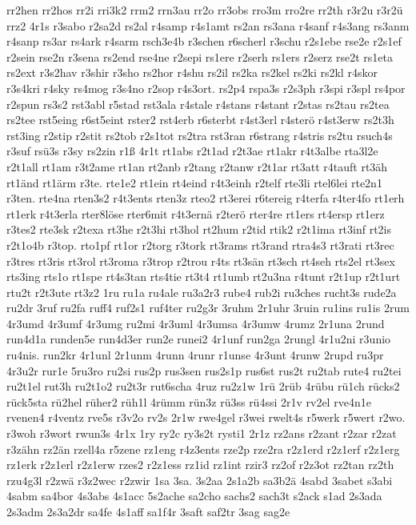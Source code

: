 {rr2hen
rr2hos
rr2i
rri3k2
rrm2
rrn3au
rr2o
rr3obs
rro3m
rro2re
rr2th
r3r2u
r3r2ü
rrz2
4r1s
r3sabo
r2sa2d
rs2al
r4samp
r4s1amt
rs2an
rs3ana
r4sanf
r4s3ang
rs3anm
r4sanp
rs3ar
rs4ark
r4sarm
rsch3e4b
r3schen
r6scherl
r3schu
r2s1ebe
rse2e
r2s1ef
r2sein
rse2n
r3sena
rs2end
rse4ne
r2sepi
rs1ere
r2serh
rs1ers
r2serz
rse2t
rs1eta
rs2ext
r3s2hav
r3shir
r3sho
rs2hor
r4shu
rs2il
rs2ka
rs2kel
rs2ki
rs2kl
r4skor
r3s4kri
r4sky
rs4mog
r3s4no
r2sop
r4s3ort.
rs2p4
rspa3s
r2s3ph
r3spi
r3spl
rs4por
r2spun
rs3s2
rst3abl
r5stad
rst3ala
r4stale
r4stans
r4stant
r2stas
rs2tau
rs2tea
rs2tee
rst5eing
r6st5eint
rster2
rst4erb
r6sterbt
r4st3erl
r4sterö
r4st3erw
rs2t3h
rst3ing
r2stip
r2stit
rs2tob
r2s1tot
rs2tra
rst3ran
r6strang
r4stris
rs2tu
rsuch4s
r3suf
rsü3s
r3sy
rs2zin
r1ß
4r1t
rt1abs
r2t1ad
r2t3ae
rt1akr
r4t3albe
rta3l2e
r2t1all
rt1am
r3t2ame
rt1an
rt2anb
r2tang
r2tanw
r2t1ar
rt3att
r4tauft
rt3äh
rt1änd
rt1ärm
r3te.
rte1e2
rt1ein
rt4eind
r4t3einh
r2telf
rte3li
rtel6lei
rte2n1
r3ten.
rte4na
rten3s2
r4t3ents
rten3z
rteo2
rt3erei
r6tereig
r4terfa
r4ter4fo
rt1erh
rt1erk
r4t3erla
rter8löse
rter6mit
r4t3ernä
r2terö
rter4re
rt1ers
rt4ersp
rt1erz
r3tes2
rte3sk
r2texa
rt3he
r2t3hi
rt3hol
rt2hum
r2tid
rtik2
r2t1ima
rt3inf
rt2is
r2t1o4b
r3top.
rto1pf
rt1or
r2torg
r3tork
rt3rams
rt3rand
rtra4s3
rt3rati
rt3rec
r3tres
rt3ris
rt3rol
rt3roma
r3trop
r2trou
r4ts
rt3sän
rt3sch
rt4seh
rts2el
rt3sex
rts3ing
rts1o
rt1spe
rt4s3tan
rts4tie
rt3t4
rt1umb
rt2u3na
r4tunt
r2t1up
r2t1urt
rtu2t
r2t3ute
rt3z2
1ru
ru1a
ru4ale
ru3a2r3
rube4
rub2i
ru3ches
rucht3s
rude2a
ru2dr
3ruf
ru2fa
ruff4
ruf2s1
ruf4ter
ru2g3r
3ruhm
2r1uhr
3ruin
ru1ins
ru1is
2rum
4r3umd
4r3umf
4r3umg
ru2mi
4r3uml
4r3umsa
4r3umw
4rumz
2r1una
2rund
run4d1a
runden5e
run4d3er
run2e
runei2
4r1unf
run2ga
2rungl
4r1u2ni
r3unio
ru4nis.
run2kr
4r1unl
2r1unm
4runn
4runr
r1unse
4r3unt
4runw
2rupd
ru3pr
4r3u2r
rur1e
5ru3ro
ru2si
rus2p
rus3sen
rus2s1p
rus6st
rus2t
ru2tab
rute4
ru2tei
ru2t1el
rut3h
ru2t1o2
ru2t3r
rut6scha
4ruz
ru2z1w
1rü
2rüb
4rübu
rü1ch
rücks2
rück5sta
rü2hel
rüher2
rüh1l
4rümm
rün3z
rü3ss
rü4ssi
2r1v
rv2el
rve4n1e
rvenen4
r4ventz
rve5s
r3v2o
rv2s
2r1w
rwe4gel
r3wei
rwelt4s
r5werk
r5wert
r2wo.
r3woh
r3wort
rwun3s
4r1x
1ry
ry2c
ry3s2t
rysti1
2r1z
rz2ans
r2zant
r2zar
r2zat
r3zähn
rz2än
rzell4a
r5zene
rz1eng
r4z3ents
rze2p
rze2ra
r2z1erd
r2z1erf
r2z1erg
rz1erk
r2z1erl
r2z1erw
rzes2
r2z1ess
rz1id
rz1int
rzir3
rz2of
r2z3ot
rz2tan
rz2th
rzu4g3l
r2zwä
r3z2wec
r2zwir
1sa
3sa.
3s2aa
2s1a2b
sa3b2ä
4sabd
3sabet
s3abi
4sabm
sa4bor
4s3abs
4s1acc
5s2ache
sa2cho
sachs2
sach3t
s2ack
s1ad
2s3ada
2s3adm
2s3a2dr
sa4fe
4s1aff
sa1f4r
3saft
saf2tr
3sag
sag2e
}
